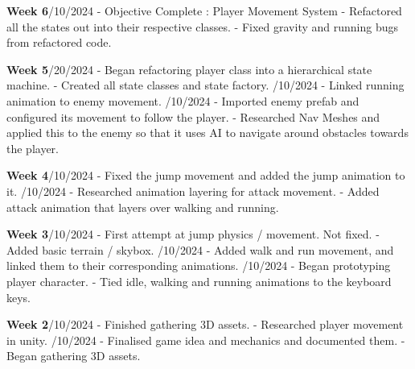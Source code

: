 \documentclass[10pt]{final_report}
\begin{document}
\textbf{Week 6}/10/2024 - Objective Complete : Player Movement System
\newline- Refactored all the states out into their respective classes.
\newline- Fixed gravity and running bugs from refactored code.

\textbf{Week 5}/20/2024
\newline- Began refactoring player class into a hierarchical state machine.
\newline- Created all state classes and state factory.
/10/2024
\newline- Linked running animation to enemy movement.
/10/2024
\newline- Imported enemy prefab and configured its movement to follow the player.
\newline- Researched Nav Meshes and applied this to the enemy so that it uses AI to navigate around obstacles towards the player.

\textbf{Week 4}/10/2024
\newline- Fixed the jump movement and added the jump animation to it.
/10/2024
\newline- Researched animation layering for attack movement.
\newline- Added attack animation that layers over walking and running.

\textbf{Week 3}/10/2024
\newline- First attempt at jump physics / movement. Not fixed.
\newline- Added basic terrain / skybox.
/10/2024
\newline- Added walk and run movement, and linked them to their corresponding animations.
/10/2024
\newline- Began prototyping player character.
\newline- Tied idle, walking and running animations to the keyboard keys.

\textbf{Week 2}/10/2024
\newline- Finished gathering 3D assets.
\newline- Researched player movement in unity.
/10/2024
\newline- Finalised game idea and mechanics and documented them.
\newline- Began gathering 3D assets.
\end{document}
